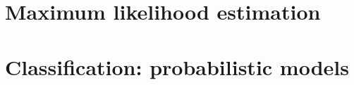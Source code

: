 \documentclass{book}
\begin{document}
\chapter{Maximum likelihood estimation}

\chapter{Classification: probabilistic models}
\end{document}
